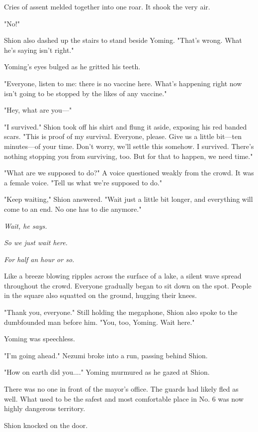 Cries of assent melded together into one roar. It shook the very air.

"No!"

Shion also dashed up the stairs to stand beside Yoming. "That's wrong.
What he's saying isn't right."

Yoming's eyes bulged as he gritted his teeth.

"Everyone, listen to me: there is no vaccine here. What's happening
right now isn't going to be stopped by the likes of any vaccine."

"Hey, what are you---"

"I survived." Shion took off his shirt and flung it aside, exposing his
red banded scars. "This is proof of my survival. Everyone, please. Give
us a little bit---ten minutes---of your time. Don't worry, we'll settle this
somehow. I survived. There's nothing stopping you from surviving, too.
But for that to happen, we need time."

\mybreak

"What are we supposed to do?" A voice questioned weakly from the crowd.
It was a female voice. "Tell us what we're supposed to do."

"Keep waiting," Shion answered. "Wait just a little bit longer, and
everything will come to an end. No one has to die anymore."

\emph{Wait, he says.}

\emph{So we just wait here.}

\emph{For half an hour or so.}

Like a breeze blowing ripples across the surface of a lake, a silent
wave spread throughout the crowd. Everyone gradually began to sit down
on the spot. People in the square also squatted on the ground, hugging
their knees.

"Thank you, everyone." Still holding the megaphone, Shion also spoke to
the dumbfounded man before him. "You, too, Yoming. Wait here."

Yoming was speechless.

"I'm going ahead." Nezumi broke into a run, passing behind Shion.

"How on earth did you...." Yoming murmured as he gazed at Shion.

\myspace

There was no one in front of the mayor's office. The guards had likely
fled as well. What used to be the safest and most comfortable place in
No. 6 was now highly dangerous territory.

Shion knocked on the door.

